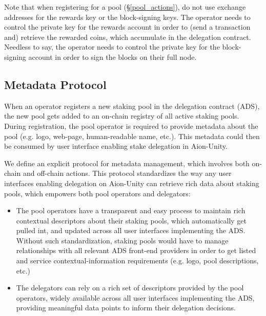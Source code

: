 Note that when registering for a pool (\S\ref{pool_actions}), do not use exchange addresses for the rewards key or the block-signing keys. The operator needs to control the private key for the rewards account in order to (send a transaction and) retrieve the rewarded coins, which accumulate in the delegation contract. Needless to say, the operator needs to control the private key for the block-signing account in order to sign the blocks on their full node.   

\subsection{Metadata Protocol} \label{metadata_protocol}
When an operator registers a new staking pool in the delegation contract (ADS), the new pool gets added to an on-chain registry of all active staking pools. During registration, the pool operator is required to provide metadata about the pool (e.g. logo, web-page, human-readable name, etc.). This metadata could then be consumed by user interface enabling stake delegation in Aion-Unity. 

We define an explicit protocol for metadata management, which involves both on-chain and off-chain actions. This protocol standardizes the way any user interfaces enabling delegation on Aion-Unity can retrieve rich data about staking pools, which empowers both pool operators and delegators: 
\begin{itemize}
    \item The pool operators have a transparent and easy process to maintain rich contextual descriptors about their staking pools, which automatically get pulled int, and updated across all user interfaces implementing the ADS. Without such standardization, staking pools would have to manage relationships with all relevant ADS front-end providers in order to get listed and service contextual-information requirements (e.g. logo, pool descriptions, etc.) 
    \item The delegators can rely on a rich set of descriptors provided by the pool operators, widely available across all user interfaces implementing the ADS, providing meaningful data points to inform their delegation decisions.   
\end{itemize}

